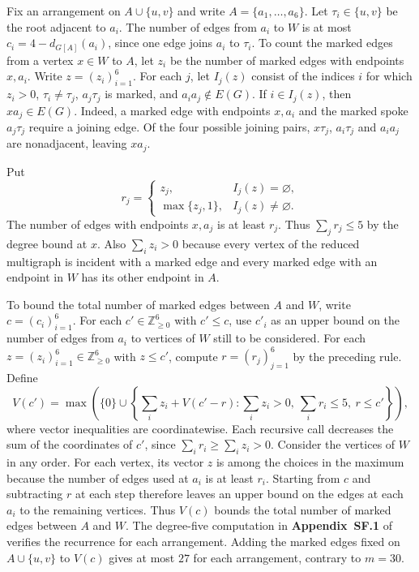 \documentclass[preprint,11pt,numbers]{elsarticle-arxiv}
\numberwithin{equation}{section}
\theoremstyle{definition}
\begin{document}
Fix an arrangement on $A\cup\{u,v\}$ and write
$A=\{a_1,\ldots,a_6\}$. Let $\tau_i\in\{u,v\}$ be the root
adjacent to $a_i$. The number of edges from $a_i$ to $W$ is at
most $c_i=4-d_{G[A]}(a_i)$, since one edge joins $a_i$ to
$\tau_i$. To count the marked edges from a vertex $x\in W$
to $A$, let $z_i$ be the number of marked edges with endpoints
$x,a_i$. Write $z=(z_i)_{i=1}^6$. For each $j$, let $I_j(z)$
consist of the indices $i$ for which $z_i>0$, $\tau_i\ne\tau_j$,
$a_j\tau_j$ is marked, and $a_ia_j\notin E(G)$.
If $i\in I_j(z)$, then $xa_j\in E(G)$. Indeed, a
marked edge with endpoints $x,a_i$ and the marked spoke
$a_j\tau_j$ require a joining edge. Of the four possible
joining pairs, $x\tau_j$, $a_i\tau_j$ and $a_ia_j$ are
nonadjacent, leaving $xa_j$.

Put
\[
 r_j=
 \begin{cases}
 z_j,&I_j(z)=\varnothing,\\
 \max\{z_j,1\},&I_j(z)\ne\varnothing.
 \end{cases}
\]
The number of edges with endpoints $x,a_j$ is
at least $r_j$. Thus $\sum_jr_j\leq5$ by the degree bound at
$x$. Also $\sum_i z_i>0$ because every vertex of the reduced
multigraph is incident with a marked edge and every marked edge
with an endpoint in $W$ has its other endpoint in $A$.

To bound the total number of marked edges between $A$ and $W$,
write $c=(c_i)_{i=1}^6$. For each $c'\in\mathbb Z_{\geq0}^6$
with $c'\leq c$, use $c'_i$ as an upper bound on the number of
edges from $a_i$ to vertices of $W$ still to be considered.
For each $z=(z_i)_{i=1}^6\in\mathbb Z_{\geq0}^6$ with
$z\leq c'$, compute $r=(r_j)_{j=1}^6$ by the preceding rule.
Define
\[
 V(c')=\max\left(
  \{0\}\cup
  \left\{\sum_i z_i+V(c'-r):
       \sum_i z_i>0,\ \sum_i r_i\leq5,\ r\leq c'\right\}
 \right),
\]
where vector inequalities are coordinatewise. Each recursive call
decreases the sum of the coordinates of $c'$, since
$\sum_i r_i\geq\sum_i z_i>0$. Consider the vertices of $W$ in any
order. For each vertex, its vector $z$ is among the choices in the
maximum because the number of edges used at $a_i$ is at least
$r_i$. Starting from $c$ and subtracting $r$ at each step therefore
leaves an upper bound on the edges at each $a_i$ to the remaining
vertices. Thus $V(c)$ bounds the total number of marked edges
between $A$ and $W$. The degree-five computation in
\textbf{Appendix~SF.1} of~\cite{FGSTSupplement} verifies the recurrence
for each arrangement.
Adding the marked edges fixed on $A\cup\{u,v\}$ to $V(c)$
gives at most $27$ for each arrangement, contrary to $m=30$.
\end{document}

